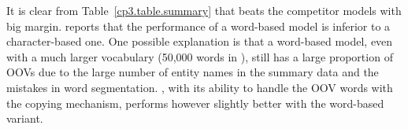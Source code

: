 

It is clear from Table~\ref{cp3.table.summary} that \copynet beats the competitor models with big margin.  reports that the performance of a word-based model is inferior to a character-based one. One possible explanation is that a word-based model, even with a much larger vocabulary (50,000 words in ), still has a large proportion of OOVs due to the large number of entity names in the summary data and the mistakes in word segmentation. \copynet, with its ability to handle the OOV words with the copying mechanism, performs however slightly better with the word-based variant.

